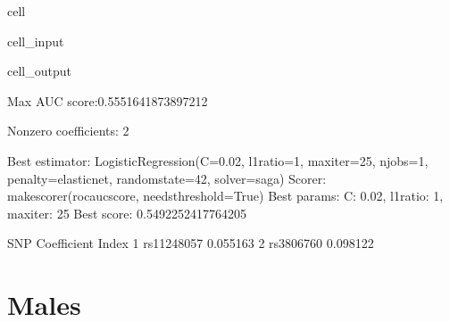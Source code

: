 \documentclass[letterpaper,10pt,english]{jupyterBook}
\begin{document}
\begin{sphinxuseclass}{cell}
\begin{sphinxVerbatimInput}
\begin{sphinxuseclass}{cell_input}
\end{sphinxuseclass}\end{sphinxVerbatimInput}
\begin{sphinxVerbatimOutput}

\begin{sphinxuseclass}{cell_output}
\begin{sphinxVerbatim}[commandchars=\\\{\}]
Max AUC score:0.5551641873897212

Non\PYGZhy{}zero coefficients: 2

Best estimator: LogisticRegression(C=0.02, l1\PYGZus{}ratio=1, max\PYGZus{}iter=25, n\PYGZus{}jobs=\PYGZhy{}1,
                   penalty=\PYGZsq{}elasticnet\PYGZsq{}, random\PYGZus{}state=42, solver=\PYGZsq{}saga\PYGZsq{})
Scorer: make\PYGZus{}scorer(roc\PYGZus{}auc\PYGZus{}score, needs\PYGZus{}threshold=True)
Best params: \PYGZob{}\PYGZsq{}C\PYGZsq{}: 0.02, \PYGZsq{}l1\PYGZus{}ratio\PYGZsq{}: 1, \PYGZsq{}max\PYGZus{}iter\PYGZsq{}: 25\PYGZcb{}
Best score: 0.5492252417764205
\end{sphinxVerbatim}

\begin{sphinxVerbatim}[commandchars=\\\{\}]
              SNP Coefficient
Index                        
1      rs11248057    0.055163
2       rs3806760    0.098122
\end{sphinxVerbatim}

\end{sphinxuseclass}\end{sphinxVerbatimOutput}

\end{sphinxuseclass}

\section{Males}
\label{\detokenize{Cooper:males}}
\end{document}
